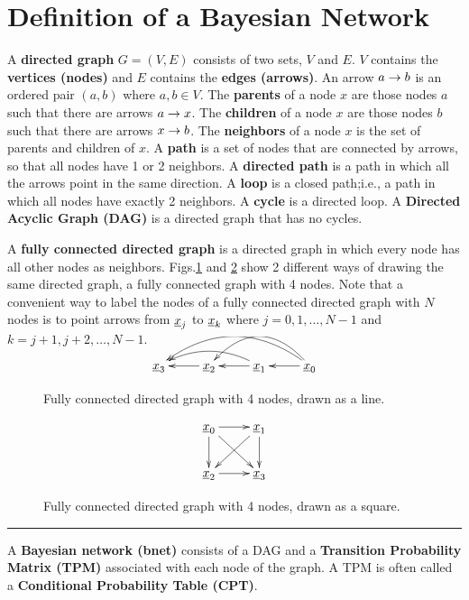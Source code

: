 \section{Definition of a Bayesian Network}
\label{ch-bnet-def}

A {\bf directed graph} $G=(V,E)$
consists of two sets, $V$
and $E$. $V$ contains
the {\bf vertices (nodes)}
and $E$ contains the {\bf edges (arrows)}.
An arrow $a\rightarrow b$ is an
ordered pair 
$(a,b)$ where $a, b\in V$.
The {\bf parents} 
of a node $x$ are 
those nodes $a$
such that there are arrows 
$a\rightarrow x$.
The {\bf children} of a node
$x$
are those nodes $b$
such that there are arrows $x\rightarrow b$.
The {\bf neighbors}
of a node $x$
is the set of parents and 
children of $x$.
A {\bf path} is a 
set of nodes that 
are connected 
by arrows, so 
that all nodes
have 1 or 2 neighbors.
A {\bf directed path}
is a path in
which all the arrows point
in the same direction.
A {\bf loop}
is a closed path;i.e.,
a path in which all
nodes have exactly 2 neighbors.
A {\bf cycle} is a directed loop.
A {\bf Directed Acyclic Graph (DAG)}
is a directed graph that has no
cycles. 


A {\bf fully connected directed graph}
is 
a directed graph
in which 
every node has all other 
nodes as neighbors.
Figs.\ref{fig-full-conn-4-line}
and
\ref{fig-full-conn-4-square}
show 2 different
ways of drawing
the same directed graph,
a fully connected graph with 4 nodes.
Note that a convenient
way
to label
the nodes of a fully
connected directed
graph
with $N$ nodes
is to point
arrows
from 
${\underline{x}}_j$ to ${\underline{x}}_k$
where $j=0, 1, \ldots, N-1$
and 
$k=j+1, j+2, \ldots, N-1$.


\begin{figure}[h!]
$$
\xymatrix{
\rvx_3
&\rvx_2\ar[l]
&\rvx_1\ar[l]\ar@/_1pc/[ll]
&\rvx_0\ar[l]\ar@/_2pc/[ll]\ar@/_2pc/[lll]
}
$$
\caption{Fully 
connected directed  graph with 4 nodes,
drawn as a line.}
\label{fig-full-conn-4-line}
\end{figure}

\begin{figure}[h!]
$$
\xymatrix{
\rvx_0\ar[r]\ar[d]\ar[rd]&\rvx_1\ar[d]\ar[ld]
\\
\rvx_2\ar[r]&\rvx_3
}
$$
\caption{Fully 
connected directed  graph with 4 nodes,
drawn as a square.}
\label{fig-full-conn-4-square}
\end{figure}

\hrule

A {\bf Bayesian network (bnet)}
consists of a DAG 
and a 
{\bf Transition 
Probability Matrix (TPM)}
associated 
with each node
of the graph.
A TPM is often 
called a {\bf Conditional Probability
Table 
(CPT)}.

